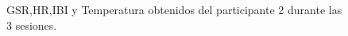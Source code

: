 \pagebreak
\begin{figure}[h]
        \centering
        \caption{GSR,HR,IBI y Temperatura obtenidos del participante 2 durante las 3 sesiones.}\label{fig:data_p2}
\end{figure}
\pagebreak


